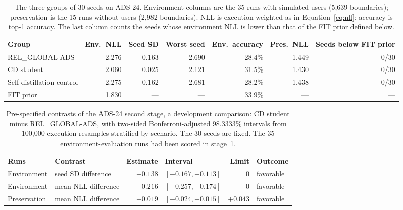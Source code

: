 \begin{table}[htbp]
\centering
\caption[The three groups of 30 seeds on ADS-24]{The three groups of 30 seeds on ADS-24. Environment columns
are the 35 runs with simulated users (5,639 boundaries); preservation is
the 15 runs without users (2,982 boundaries). NLL is execution-weighted
as in Equation~\ref{eq:nll}; accuracy is top-1 accuracy. The last
column counts the seeds whose environment NLL is lower than that of the
FIT prior defined below.}
\label{tab:ads24-groups}
\small
\setlength{\tabcolsep}{4pt}
\begin{tabular}{@{}lrrrrrr@{}}
\toprule
Group & Env.\ NLL & Seed SD & Worst seed & Env.\ accuracy
  & Pres.\ NLL & Seeds below FIT prior \\
\midrule
REL\_GLOBAL-ADS            & 2.276 & 0.163 & 2.690 & 28.4\% & 1.449 & 0/30 \\
CD student                 & 2.060 & 0.025 & 2.121 & 31.5\% & 1.430 & 0/30 \\
Self-distillation control  & 2.275 & 0.162 & 2.681 & 28.2\% & 1.438 & 0/30 \\
FIT prior                  & 1.830 & ---   & ---   & 33.9\% & ---   & --- \\
\bottomrule
\end{tabular}
\end{table}

\begin{table}[htbp]
\centering
\caption[Pre-specified contrasts of the ADS-24 second stage]{Pre-specified contrasts of the ADS-24 second stage, a
development comparison: CD student minus REL\_GLOBAL-ADS, with two-sided
Bonferroni-adjusted 98.3333\% intervals from 100,000 execution resamples
stratified by scenario. The 30 seeds are fixed. The 35
environment-evaluation runs had been scored in stage~1.}
\label{tab:ads24-criteria}
\small
\begin{tabular}{@{}llrlrl@{}}
\toprule
Runs & Contrast & Estimate & Interval & Limit & Outcome \\
\midrule
Environment  & seed SD difference & $-0.138$ & $[-0.167, -0.113]$ & $0$
  & favorable \\
Environment  & mean NLL difference & $-0.216$ & $[-0.257, -0.174]$ & $0$
  & favorable \\
Preservation & mean NLL difference & $-0.019$ & $[-0.024, -0.015]$
  & $+0.043$ & favorable \\
\bottomrule
\end{tabular}
\end{table}

